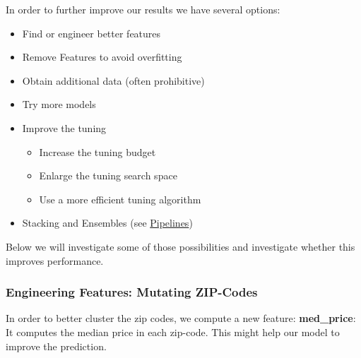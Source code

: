 \documentclass[]{article}
\newenvironment{Shaded}{}{}
\newcommand{\CommentTok}[1]{\textcolor[rgb]{0.00,0.50,0.00}{#1}}
\newcommand{\DataTypeTok}[1]{#1}
\newcommand{\KeywordTok}[1]{\textcolor[rgb]{0.00,0.00,1.00}{#1}}
\newcommand{\NormalTok}[1]{#1}
\newcommand{\OperatorTok}[1]{#1}
\newcommand{\StringTok}[1]{\textcolor[rgb]{0.00,0.50,0.50}{#1}}
\providecommand{\tightlist}{%
  \setlength{\itemsep}{0pt}\setlength{\parskip}{0pt}}
\renewenvironment{Shaded} {\begin{snugshade}\small} {\end{snugshade}}
\begin{document}
In order to further improve our results we have several options:

\begin{itemize}
\tightlist
\item
  Find or engineer better features
\item
  Remove Features to avoid overfitting
\item
  Obtain additional data (often prohibitive)
\item
  Try more models
\item
  Improve the tuning

  \begin{itemize}
  \tightlist
  \item
    Increase the tuning budget
  \item
    Enlarge the tuning search space
  \item
    Use a more efficient tuning algorithm
  \end{itemize}
\item
  Stacking and Ensembles (see \protect\hyperlink{pipelines}{Pipelines})
\end{itemize}

Below we will investigate some of those possibilities and investigate whether this improves performance.

\hypertarget{engineering-features-mutating-zip-codes}{%
\subsubsection{Engineering Features: Mutating ZIP-Codes}\label{engineering-features-mutating-zip-codes}}

In order to better cluster the zip codes, we compute a new feature: \textbf{med\_price}:
It computes the median price in each zip-code.
This might help our model to improve the prediction.

\begin{Shaded}
\end{Shaded}
\end{document}
